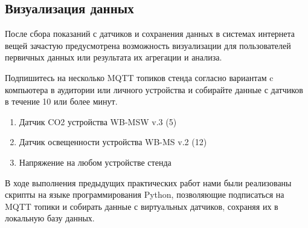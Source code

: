 \documentclass[a4paper,14pt]{extarticle}
\begin{document}
\subsection{Визуализация данных}
После сбора показаний с датчиков и сохранения данных в системах
интернета вещей зачастую предусмотрена возможность визуализации для
пользователей первичных данных или результата их агрегации и анализа.
\begin{problem}
	Подпишитесь на несколько MQTT топиков стенда согласно
	вариантам c компьютера в аудитории или личного устройства и собирайте
	данные с датчиков в течение 10 или более минут.
	\begin{enumerate}
		\item Датчик CO2 устройства WB-MSW v.3 (5)
		\item Датчик освещенности устройства WB-MS v.2 (12)
		\item Напряжение на любом устройстве стенда
	\end{enumerate}
\nonum В ходе выполнения предыдущих практических работ нами были реализованы скрипты на языке программирования Python, позволяющие подписаться на MQTT топики и собирать данные с виртуальных датчиков, сохраняя их в локальную базу данных.
\end{problem}
\end{document}
